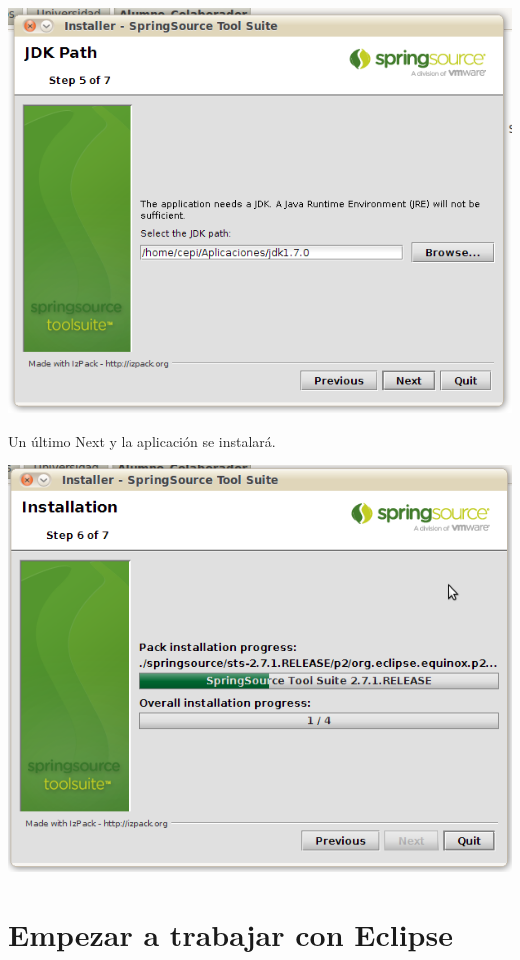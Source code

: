 \documentclass[a4paper,12pt,spanish]{article}
\begin{document}
\begin{center}
\includegraphics[scale=0.5]{ide5}
\end{center}

Un último Next y la aplicación se instalará.

\begin{center}
\includegraphics[scale=0.5]{ide6}
\end{center}

\section{Empezar a trabajar con Eclipse}
\end{document}
